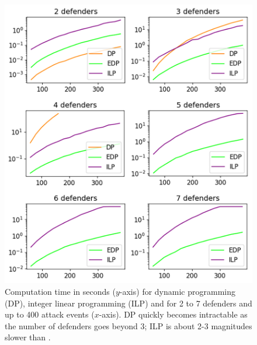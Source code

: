 \begin{figure}[h!]
    \centering
    \includegraphics[width=\linewidth]{chapters/pd/fig/timecost-v.png}
    \caption{Computation time in seconds ($y$-axis) for dynamic programming (DP), integer linear programming (ILP) and \ours for 2 to 7 defenders and up to 400 attack events ($x$-axis). DP quickly becomes intractable as the number of defenders goes beyond $3$; ILP is about 2-3 magnitudes slower than \ours.}
    \label{fig:time_cost}
\end{figure}


